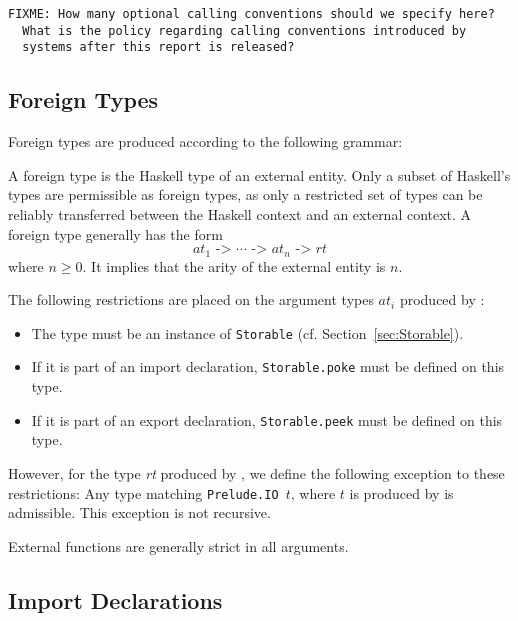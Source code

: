 \documentclass[a4paper,twosides]{article}
\newcommand{\code}[1]{\texttt{#1}}
\begin{document}
\begin{verbatim}
FIXME: How many optional calling conventions should we specify here?
  What is the policy regarding calling conventions introduced by
  systems after this report is released?
\end{verbatim}

\subsection{Foreign Types}
\label{sec:foreign-types}

Foreign types are produced according to the following grammar:
%
\begin{grammar}
  \gor{%
    ()}
\end{grammar}
%
A foreign type is the Haskell type of an external entity.  Only a subset of
Haskell's types are permissible as foreign types, as only a restricted set of
types can be reliably transferred between the Haskell context and an external
context.  A foreign type generally has the form
\[
\textit{at}_1\code{ -> }\cdots\code{ -> }\textit{at}_n\code{ -> }\textit{rt}
\]
where \(n\geq0\).  It implies that the arity of the external entity is $n$.

The following restrictions are placed on the argument types \(\textit{at}_i\)
produced by :
%
\begin{itemize}
\item The type must be an instance of \code{Storable}
  (cf. Section~\ref{sec:Storable}).
\item If it is part of an import declaration, \code{Storable.poke} must be
  defined on this type.
\item If it is part of an export declaration, \code{Storable.peek} must be
  defined on this type.
\end{itemize}
%
However, for the type \textit{rt} produced by , we define the
following exception to these restrictions: Any type matching \code{Prelude.IO
  }$t$, where $t$ is produced by  is admissible.  This
exception is not recursive.

External functions are generally strict in all arguments.

\subsection{Import Declarations}
\label{sec:import}
\end{document}
